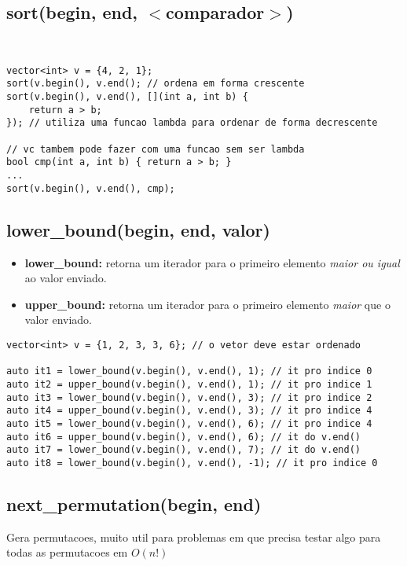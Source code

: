 \subsection{sort(begin, end, $<$comparador$>$)}

\ 

\begin{lstlisting}
vector<int> v = {4, 2, 1};
sort(v.begin(), v.end(); // ordena em forma crescente
sort(v.begin(), v.end(), [](int a, int b) {
	return a > b;
}); // utiliza uma funcao lambda para ordenar de forma decrescente

// vc tambem pode fazer com uma funcao sem ser lambda
bool cmp(int a, int b) { return a > b; }
...
sort(v.begin(), v.end(), cmp); 
\end{lstlisting}

\subsection{lower\_bound(begin, end, valor)}

\begin{itemize}[noitemsep]
\item \textbf{lower\_bound:} retorna um iterador para o primeiro elemento \textit{maior ou igual} ao valor enviado.
\item \textbf{upper\_bound:} retorna um iterador para o primeiro elemento \textit{maior} que o valor enviado.
\end{itemize}

\begin{lstlisting}
vector<int> v = {1, 2, 3, 3, 6}; // o vetor deve estar ordenado

auto it1 = lower_bound(v.begin(), v.end(), 1); // it pro indice 0
auto it2 = upper_bound(v.begin(), v.end(), 1); // it pro indice 1
auto it3 = lower_bound(v.begin(), v.end(), 3); // it pro indice 2
auto it4 = upper_bound(v.begin(), v.end(), 3); // it pro indice 4
auto it5 = lower_bound(v.begin(), v.end(), 6); // it pro indice 4
auto it6 = upper_bound(v.begin(), v.end(), 6); // it do v.end()
auto it7 = lower_bound(v.begin(), v.end(), 7); // it do v.end()
auto it8 = lower_bound(v.begin(), v.end(), -1); // it pro indice 0
\end{lstlisting}
    
\subsection{next\_permutation(begin, end)}

Gera permutacoes, muito util para problemas em que precisa testar algo para todas as permutacoes em $O(n!)$

